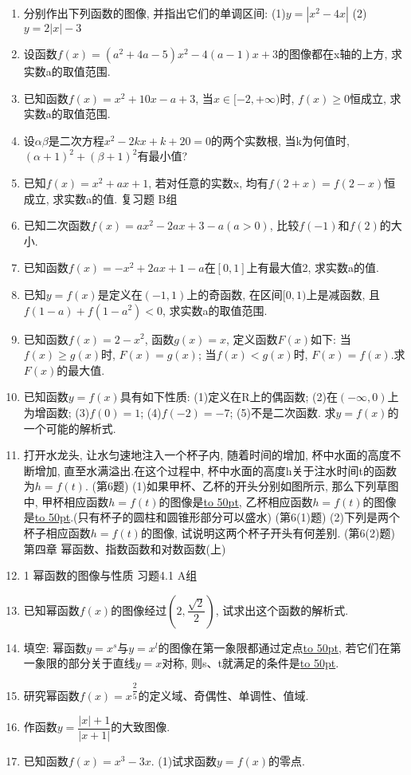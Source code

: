 \documentclass[10pt,a4paper]{article}
\newcommand{\blank}[1]{\underline{\hbox to #1pt{}}}
\begin{document}
\begin{enumerate}[1.]
\item 分别作出下列函数的图像, 并指出它们的单调区间:
(1)$y=|x^2-4x|$							(2)$y=2|x|-3$
\item 设函数$f(x)=(a^2+4a-5)x^2-4(a-1)x+3$的图像都在x轴的上方, 求实数a的取值范围.
\item 已知函数$f(x)=x^2+10x-a+3$, 当$x\in [-2,+\infty)$时, $f(x)\ge 0$恒成立, 求实数a的取值范围.
\item 设$\alpha \beta$是二次方程$x^2-2kx+k+20=0$的两个实数根, 当k为何值时, $(\alpha +1)^2+(\beta +1)^2$有最小值?
\item 已知$f(x)=x^2+ax+1$, 若对任意的实数x, 均有$f(2+x)=f(2-x)$恒成立, 求实数a的值.
复习题
B组
\item 已知二次函数$f(x)=ax^2-2ax+3-a(a>0)$, 比较$f(-1)$和$f(2)$的大小.
\item 已知函数$f(x)=-x^2+2ax+1-a$在$[0,1]$上有最大值2, 求实数a的值.
\item 已知$y=f(x)$是定义在$(-1,1)$上的奇函数, 在区间$[0,1)$上是减函数, 且$f(1-a)+f(1-a^2)<0$, 求实数a的取值范围.
\item 已知函数$f(x)=2-x^2$, 函数$g(x)=x$, 定义函数$F(x)$如下: 当$f(x)\ge g(x)$时, $F(x)=g(x)$; 当$f(x)<g(x)$时, $F(x)=f(x)$.求$F(x)$的最大值.
\item 已知函数$y=f(x)$具有如下性质: (1)定义在R上的偶函数; (2)在$(-\infty ,0)$上为增函数; (3)$f(0)=1$; (4)$f(-2)=-7$; (5)不是二次函数.
求$y=f(x)$的一个可能的解析式.
\item 打开水龙头, 让水匀速地注入一个杯子内, 随着时间的增加, 杯中水面的高度不断增加, 直至水满溢出.在这个过程中, 杯中水面的高度h关于注水时间t的函数为$h=f(t)$.
(第6题)
(1)如果甲杯、乙杯的开头分别如图所示, 那么下列草图中, 甲杯相应函数$h=f(t)$的图像是\blank{50}, 乙杯相应函数$h=f(t)$的图像是\blank{50}.(只有杯子的圆柱和圆锥形部分可以盛水)
(第6(1)题)
(2)下列是两个杯子相应函数$h=f(t)$的图像, 试说明这两个杯子开头有何差别.
(第6(2)题)
第四章  幂函数、指数函数和对数函数(上)
\item 1  幂函数的图像与性质
习题4.1  A组
\item 已知幂函数$f(x)$的图像经过$(2,\dfrac{\sqrt 2}2)$, 试求出这个函数的解析式.
\item 填空:
幂函数$y=x^s$与$y=x^l$的图像在第一象限都通过定点\blank{50}, 若它们在第一象限的部分关于直线$y=x$对称, 则s、t就满足的条件是\blank{50}.
\item 研究幂函数$f(x)=x^{\dfrac 25}$的定义域、奇偶性、单调性、值域.
\item 作函数$y=\dfrac{|x|+1}{|x+1|}$的大致图像.
\item 已知函数$f(x)=x^3-3x$.
(1)试求函数$y=f(x)$的零点.

\end{enumerate}
\end{document}
